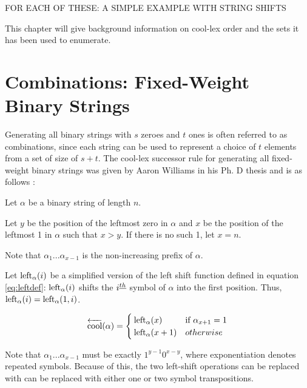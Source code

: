 FOR EACH OF THESE: A SIMPLE EXAMPLE WITH STRING SHIFTS

This chapter will give background information on cool-lex order and the sets it has been used to enumerate.  
\section{Combinations: Fixed-Weight Binary Strings} \label{sec:coolCombo}
Generating all binary strings with $s$ zeroes and $t$ ones is often referred to as combinations, since each string can be used to represent a choice of $t$ elements from a set of size of $s+t$.  The cool-lex successor rule for generating all fixed-weight binary strings was given by Aaron Williams in his Ph. D thesis and is as follows \cite{williams2009shift}:

 Let $\alpha$ be a binary string of length $n$.

 Let $y$ be the position of the leftmost zero in $\alpha$ and $x$ be the position of the leftmost 1 in $\alpha$ such that $x > y$.  If there is no such 1, let $x=n$.

 Note that $\alpha_1...\alpha_{x-1}$ is the non-increasing prefix of $\alpha$.

 Let $\leftshift[\alpha]{i}$ be a simplified version of the left shift function defined in equation \ref{eq:leftdef}:  $\leftshift[\alpha]{i}$ shifts the $i\thh$ symbol of $\alpha$ into the first position.  Thus, $\leftshift[\alpha]{i}=\lshiftindex[\alpha]{1}{i}$.


\begin{equation*}
    \overleftarrow{\text{cool}}(\alpha) = \begin{cases}
	\leftshift[\alpha]{x} & \text{if $\alpha_{x+1}=1$}\\
	\leftshift[\alpha]{x+1} & otherwise\\
\end{cases}
\end{equation*}

Note that $\alpha_1...\alpha_{x-1}$ must be exactly $1^{y-1}0^{x-y}$, where exponentiation denotes repeated symbols.  Because of this, the two left-shift operations can be replaced with can be replaced with either one or two symbol transpositions.

